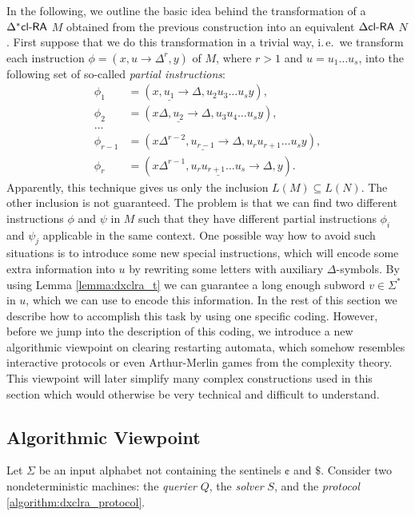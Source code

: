 In the following, we outline the basic idea behind the transformation of a $\textup{\sf $\Delta^*$cl-RA\/}$ $M$ obtained from the previous construction into an equivalent $\textup{\sf $\Delta$cl-RA\/}$ $N$. First suppose that we do this transformation in a trivial way, i.\,e.\ we transform each instruction $\phi = (x, u \to \Delta^r, y)$ of $M$, where $r > 1$ and $u = u_1 \ldots u_s$, into the following set of so-called \emph{partial instructions}:
$$
\begin{array}{ll}
\phi_1 & = (x, \underline{u_1} \to \Delta, u_2 u_3 \ldots u_s y),\\
\phi_2 & = (x \Delta, \underline{u_2} \to \Delta, u_3 u_4 \ldots u_s y),\\
\ldots\\
\phi_{r-1} & = (x \Delta^{r-2}, \underline{u_{r-1}} \to
\Delta, u_r u_{r+1} \ldots u_s y),\\
\phi_r & = (x \Delta^{r-1}, \underline{u_r u_{r+1} \ldots u_s} \to \Delta, y).
\end{array}
$$
Apparently, this technique gives us only the inclusion $L(M) \subseteq L(N)$. The other inclusion is not guaranteed. The problem is that we can find two different instructions $\phi$ and $\psi$ in $M$ such that they have different partial instructions $\phi_i$ and $\psi_j$ applicable in the same context. One possible way how to avoid such situations is to introduce some new special instructions, which will encode some extra information into $u$ by rewriting some letters with auxiliary $\Delta$-symbols. By using Lemma \ref{lemma:dxclra_t} we can guarantee a long enough subword $v \in \Sigma^*$ in $u$, which we can use to encode this information. In the rest of this section we describe how to accomplish this task by using one specific coding. However, before we jump into the description of this coding, we introduce a new algorithmic viewpoint on clearing restarting automata, which somehow resembles interactive protocols or even Arthur-Merlin games from the complexity theory. This viewpoint will later simplify many complex constructions used in this section which would otherwise be very technical and difficult to understand.

\subsection{Algorithmic Viewpoint}\label{section:dxclra_viewpoint}

Let $\Sigma$ be an input alphabet not containing the sentinels $\cent$ and $\$$. Consider two nondeterministic machines: the \emph{querier} $Q$, the \emph{solver} $S$, and the \emph{protocol} \ref{algorithm:dxclra_protocol}.

